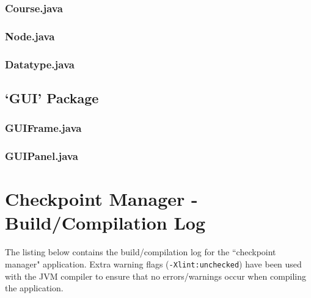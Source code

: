 \documentclass[a4paper, 10pt]{article}
\begin{document}
\clearpage
\subsubsection{Course.java}


\clearpage
\subsubsection{Node.java}


\clearpage
\subsubsection{Datatype.java}


\clearpage
\subsection{`GUI' Package}

\subsubsection{GUIFrame.java}


\clearpage
\subsubsection{GUIPanel.java}


\clearpage
\section{Checkpoint Manager - Build/Compilation Log}

The listing below contains the build/compilation log for the ``checkpoint manager" application. Extra warning flags (\verb+-Xlint:unchecked+) have been used with the JVM compiler to ensure that no errors/warnings occur when compiling the application. \\


\end{document}

